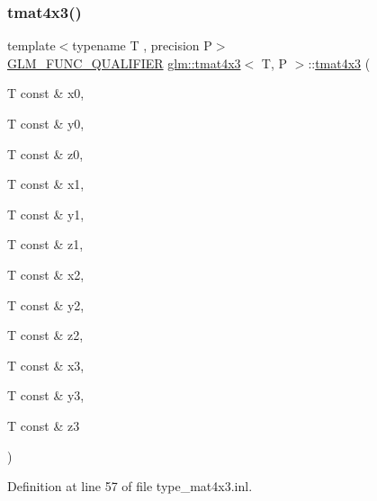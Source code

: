 \mbox{\label{structglm_1_1tmat4x3_ac85a3693a2bef96d65be77e76c70acdb}} 
\subsubsection{\texorpdfstring{tmat4x3()}{tmat4x3()}\hspace{0.1cm}{\footnotesize\ttfamily [6/22]}}
{\footnotesize\ttfamily template$<$typename T , precision P$>$ \\
\mbox{\hyperlink{setup_8hpp_a33fdea6f91c5f834105f7415e2a64407}{G\+L\+M\+\_\+\+F\+U\+N\+C\+\_\+\+Q\+U\+A\+L\+I\+F\+I\+ER}} \mbox{\hyperlink{structglm_1_1tmat4x3}{glm\+::tmat4x3}}$<$ T, P $>$\+::\mbox{\hyperlink{structglm_1_1tmat4x3}{tmat4x3}} (\begin{DoxyParamCaption}\item[{T const \&}]{x0,  }\item[{T const \&}]{y0,  }\item[{T const \&}]{z0,  }\item[{T const \&}]{x1,  }\item[{T const \&}]{y1,  }\item[{T const \&}]{z1,  }\item[{T const \&}]{x2,  }\item[{T const \&}]{y2,  }\item[{T const \&}]{z2,  }\item[{T const \&}]{x3,  }\item[{T const \&}]{y3,  }\item[{T const \&}]{z3 }\end{DoxyParamCaption})}



Definition at line 57 of file type\+\_\+mat4x3.\+inl.

\mbox{\label{structglm_1_1tmat4x3_acc604d134635bd3f611a8201cacd79c5}} 
